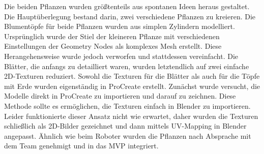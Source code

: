 Die beiden Pflanzen wurden größtenteils aus spontanen Ideen heraus gestaltet. Die Hauptüberlegung bestand darin, zwei verschiedene Pflanzen zu kreieren. Die Blumentöpfe für beide Pflanzen wurden aus simplen Zylindern modelliert. Ursprünglich wurde der Stiel der kleineren Pflanze mit verschiedenen Einstellungen der Geometry Nodes als komplexes Mesh erstellt. Diese Herangehensweise wurde jedoch verworfen und stattdessen vereinfacht. Die Blätter, die anfangs zu detailliert waren, wurden letztendlich auf zwei einfache 2D-Texturen reduziert. Sowohl die Texturen für die Blätter als auch für die Töpfe mit Erde wurden eigenständig in ProCreate erstellt. Zunächst wurde versucht, die Modelle direkt in ProCreate zu importieren und darauf zu zeichnen. Diese Methode sollte es ermöglichen, die Texturen einfach in Blender zu importieren. Leider funktionierte dieser Ansatz nicht wie erwartet, daher wurden die Texturen schließlich als 2D-Bilder gezeichnet und dann mittels UV-Mapping in Blender angepasst. Ähnlich wie beim Roboter wurden die Pflanzen nach Absprache mit dem Team genehmigt und in das MVP integriert.
